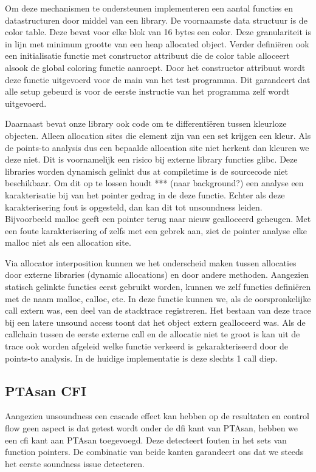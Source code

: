 \documentclass[conference]{IEEEtran}
\begin{document}
Om deze mechanismen te ondersteunen implementeren een aantal functies en datastructuren door middel van een library. De voornaamste data structuur is de color table. Deze bevat voor elke blok van 16 bytes een color. Deze granulariteit is in lijn met minimum grootte van een heap allocated object. Verder definiëren ook een initialisatie functie met constructor attribuut die de color table alloceert alsook de global coloring functie aanroept. Door het constructor attribuut wordt deze functie uitgevoerd voor de main van het test programma. Dit garandeert dat alle setup gebeurd is voor de eerste instructie van het programma zelf wordt uitgevoerd.

Daarnaast bevat onze library ook code om te differentiëren tussen kleurloze objecten. Alleen allocation sites die element zijn van een set krijgen een kleur. Als de points-to analysis dus een bepaalde allocation site niet herkent dan kleuren we deze niet. Dit is voornamelijk een risico bij externe library functies glibc. Deze libraries worden dynamisch gelinkt dus at compiletime is de sourcecode niet beschikbaar. Om dit op te lossen houdt *** (naar background?) een analyse een karakterisatie bij van het pointer gedrag in de deze functie. Echter als deze karakterisering fout is opgesteld, dan kan dit tot unsoundness leiden. Bijvoorbeeld malloc geeft een pointer terug naar nieuw gealloceerd geheugen. Met een foute karakterisering of zelfs met een gebrek aan, ziet de pointer analyse elke malloc niet als een allocation site. 

Via allocator interposition kunnen we het onderscheid maken tussen allocaties door externe libraries (dynamic allocations) en door andere methoden. Aangezien statisch gelinkte functies eerst gebruikt worden, kunnen we zelf functies definiëren met de naam malloc, calloc, etc. In deze functie kunnen we, als de oorspronkelijke call extern was, een deel van de stacktrace registreren. Het bestaan van deze trace bij een latere unsound access toont dat het object extern gealloceerd was. Als de callchain tussen de eerste externe call en de allocatie niet te groot is kan uit de trace ook worden afgeleid welke functie verkeerd is gekarakteriseerd door de points-to analysis. In de huidige implementatie is deze slechts 1 call diep.

\subsection{PTAsan CFI}
Aangezien unsoundness een cascade effect kan hebben op de resultaten en control flow geen aspect is dat getest wordt onder de \gls{dfi} kant van PTAsan, hebben we een \gls{cfi} kant aan PTAsan toegevoegd. Deze detecteert fouten in het sets van function pointers. De combinatie van beide kanten garandeert ons dat we steeds het eerste soundness issue detecteren.
\end{document}
